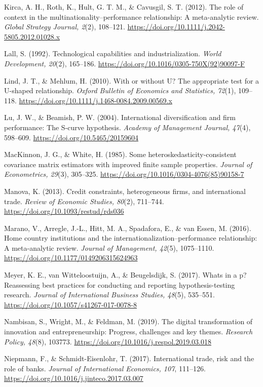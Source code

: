 \documentclass[12pt,a4paper]{article}
\begin{document}
Kirca, A. H., Roth, K., Hult, G. T. M., \& Cavusgil, S. T. (2012). The
role of context in the multinationality--performance relationship: A
meta-analytic review. \emph{Global Strategy Journal, 2}(2), 108--121.
\url{https://doi.org/10.1111/j.2042-5805.2012.01028.x}

Lall, S. (1992). Technological capabilities and industrialization.
\emph{World Development, 20}(2), 165--186.
\url{https://doi.org/10.1016/0305-750X(92)90097-F}

Lind, J. T., \& Mehlum, H. (2010). With or without U? The appropriate
test for a U-shaped relationship. \emph{Oxford Bulletin of Economics and
Statistics, 72}(1), 109--118.
\url{https://doi.org/10.1111/j.1468-0084.2009.00569.x}

Lu, J. W., \& Beamish, P. W. (2004). International diversification and
firm performance: The S-curve hypothesis. \emph{Academy of Management
Journal, 47}(4), 598--609. \url{https://doi.org/10.5465/20159604}

MacKinnon, J. G., \& White, H. (1985). Some
heteroskedasticity-consistent covariance matrix estimators with improved
finite sample properties. \emph{Journal of Econometrics, 29}(3),
305--325. \url{https://doi.org/10.1016/0304-4076(85)90158-7}

Manova, K. (2013). Credit constraints, heterogeneous firms, and
international trade. \emph{Review of Economic Studies, 80}(2), 711--744.
\url{https://doi.org/10.1093/restud/rds036}

Marano, V., Arregle, J.-L., Hitt, M. A., Spadafora, E., \& van Essen, M.
(2016). Home country institutions and the
internationalization--performance relationship: A meta-analytic review.
\emph{Journal of Management, 42}(5), 1075--1110.
\url{https://doi.org/10.1177/0149206315624963}

Meyer, K. E., van Witteloostuijn, A., \& Beugelsdijk, S. (2017).
What\textquotesingle s in a p? Reassessing best practices for conducting
and reporting hypothesis-testing research. \emph{Journal of
International Business Studies, 48}(5), 535--551.
\url{https://doi.org/10.1057/s41267-017-0078-8}

Nambisan, S., Wright, M., \& Feldman, M. (2019). The digital
transformation of innovation and entrepreneurship: Progress, challenges
and key themes. \emph{Research Policy, 48}(8), 103773.
\url{https://doi.org/10.1016/j.respol.2019.03.018}

Niepmann, F., \& Schmidt-Eisenlohr, T. (2017). International trade, risk
and the role of banks. \emph{Journal of International Economics, 107},
111--126. \url{https://doi.org/10.1016/j.jinteco.2017.03.007}
\end{document}
